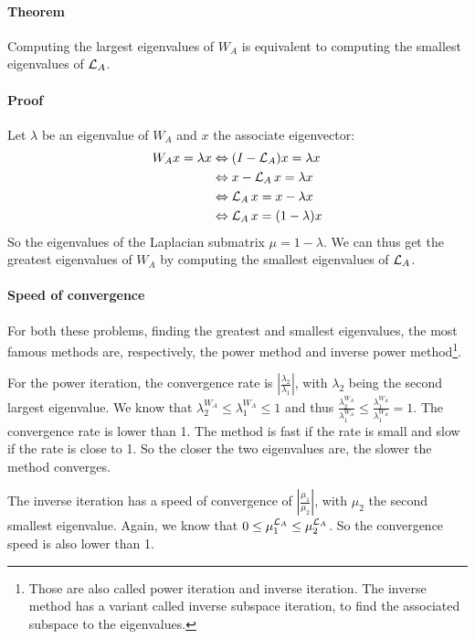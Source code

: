 \paragraph{Theorem}
Computing the largest eigenvalues of \(W_A\) is equivalent to computing the smallest eigenvalues of \(\operatorname{\mathcal{L}}_A\).

\paragraph{Proof}
Let \(\lambda\) be an eigenvalue of \(W_A\) and \(x\) the associate eigenvector:
\begin{equation}
 \begin{split}
     W_A x = \lambda x & \Leftrightarrow (I - \operatorname{\mathcal{L}}_A)x = \lambda x \\
                     & \Leftrightarrow x - \operatorname{\mathcal{L}}_A x = \lambda x \\
                     & \Leftrightarrow \operatorname{\mathcal{L}}_A x = x - \lambda x \\
                     & \Leftrightarrow \operatorname{\mathcal{L}}_A x = (1 - \lambda) x
 \end{split}
\end{equation}
So the eigenvalues of the Laplacian submatrix \(\mu = 1 - \lambda\).
We can thus get the greatest eigenvalues of \(W_A\) by computing the smallest eigenvalues of \(\operatorname{\mathcal{L}}_A\).

\paragraph{Speed of convergence}
For both these problems, finding the greatest and smallest eigenvalues, the most famous methods are, respectively, the power method and inverse power method\footnote{Those are also called power iteration and inverse iteration. The inverse method has a variant called inverse subspace iteration, to find the associated subspace to the eigenvalues.}.

For the power iteration, the convergence rate is \(|\frac{\lambda_2}{\lambda_1}|\), with \(\lambda_2\) being the second largest eigenvalue.
We know that \(\lambda^{W_A}_2 \le \lambda^{W_A}_1 \le 1\) and thus \(\frac{\lambda^{W_A}_2}{\lambda^{W_A}_1} \le \frac{\lambda^{W_A}_1}{\lambda^{W_A}_1} = 1\).
The convergence rate is lower than 1.
The method is fast if the rate is small and slow if the rate is close to 1.
So the closer the two eigenvalues are, the slower the method converges.

The inverse iteration has a speed of convergence of \(|\frac{\mu_1}{\mu_2}|\), with \(\mu_2\) the second smallest eigenvalue.
Again, we know that \(0 \le \mu^{\operatorname{\mathcal{L}}_A}_1 \le \mu^{\operatorname{\mathcal{L}}_A}_2\).
So the convergence speed is also lower than 1.

